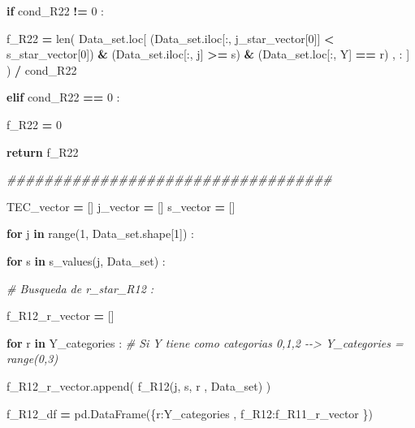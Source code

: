 \documentclass[
  11pt,
  a4paper,
]{article}
\newenvironment{Shaded}{\begin{snugshade}}{\end{snugshade}}
\newcommand{\BuiltInTok}[1]{#1}
\newcommand{\CommentTok}[1]{\textcolor[rgb]{0.56,0.35,0.01}{\textit{#1}}}
\newcommand{\ControlFlowTok}[1]{\textcolor[rgb]{0.13,0.29,0.53}{\textbf{#1}}}
\newcommand{\DecValTok}[1]{\textcolor[rgb]{0.00,0.00,0.81}{#1}}
\newcommand{\KeywordTok}[1]{\textcolor[rgb]{0.13,0.29,0.53}{\textbf{#1}}}
\newcommand{\NormalTok}[1]{#1}
\newcommand{\OperatorTok}[1]{\textcolor[rgb]{0.81,0.36,0.00}{\textbf{#1}}}
\newcommand{\StringTok}[1]{\textcolor[rgb]{0.31,0.60,0.02}{#1}}
\begin{document}
\begin{Shaded}
\begin{Highlighting}[]
            \ControlFlowTok{if}\NormalTok{  cond\_R22 }\OperatorTok{!=} \DecValTok{0}\NormalTok{ :}

\NormalTok{                f\_R22 }\OperatorTok{=} \BuiltInTok{len}\NormalTok{( Data\_set.loc[ (Data\_set.iloc[:, j\_star\_vector[}\DecValTok{0}\NormalTok{]] }\OperatorTok{\textless{}}\NormalTok{ s\_star\_vector[}\DecValTok{0}\NormalTok{]) }\OperatorTok{\&}\NormalTok{ (Data\_set.iloc[:, j] }\OperatorTok{\textgreater{}=}\NormalTok{ s) }\OperatorTok{\&}\NormalTok{ (Data\_set.loc[:, }\StringTok{\textquotesingle{}Y\textquotesingle{}}\NormalTok{] }\OperatorTok{==}\NormalTok{ r) , : ] ) }\OperatorTok{/}\NormalTok{ cond\_R22}

            
            \ControlFlowTok{elif}\NormalTok{ cond\_R22 }\OperatorTok{==} \DecValTok{0}\NormalTok{ :}

\NormalTok{                f\_R22 }\OperatorTok{=} \DecValTok{0}

            
            \ControlFlowTok{return}\NormalTok{ f\_R22 }


        \CommentTok{\#\#\#\#\#\#\#\#\#\#\#\#\#\#\#\#\#\#\#\#\#\#\#\#\#\#\#\#\#\#\#\#\#\#\#}

\NormalTok{        TEC\_vector }\OperatorTok{=}\NormalTok{ []}
\NormalTok{        j\_vector }\OperatorTok{=}\NormalTok{ []}
\NormalTok{        s\_vector }\OperatorTok{=}\NormalTok{ []}


        \ControlFlowTok{for}\NormalTok{ j }\KeywordTok{in} \BuiltInTok{range}\NormalTok{(}\DecValTok{1}\NormalTok{, Data\_set.shape[}\DecValTok{1}\NormalTok{]) :}

            \ControlFlowTok{for}\NormalTok{ s }\KeywordTok{in}\NormalTok{ s\_values(j, Data\_set) :}

                \CommentTok{\# Busqueda de r\_star\_R12 :}

\NormalTok{                f\_R12\_r\_vector }\OperatorTok{=}\NormalTok{ []}

                \ControlFlowTok{for}\NormalTok{ r }\KeywordTok{in}\NormalTok{ Y\_categories :  }\CommentTok{\# Si Y tiene como categorias 0,1,2 {-}{-}\textgreater{} Y\_categories = range(0,3)}

\NormalTok{                    f\_R12\_r\_vector.append( f\_R12(j, s, r , Data\_set) )}

\NormalTok{                f\_R12\_df }\OperatorTok{=}\NormalTok{ pd.DataFrame(\{}\StringTok{\textquotesingle{}r\textquotesingle{}}\NormalTok{:Y\_categories  , }\StringTok{\textquotesingle{}f\_R12\textquotesingle{}}\NormalTok{:f\_R11\_r\_vector \})}
        

\end{Highlighting}
\end{Shaded}
\end{document}
